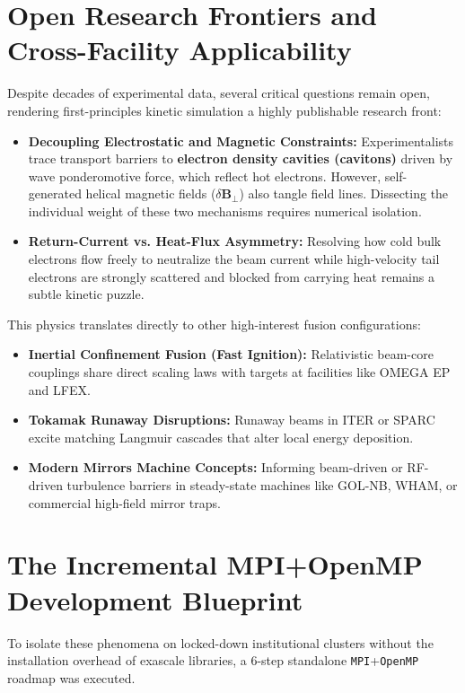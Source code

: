 \documentclass[11pt,a4paper]{article}
\begin{document}
\section{Open Research Frontiers and Cross-Facility Applicability}\label{sec:open_q}
Despite decades of experimental data, several critical questions remain open, rendering first-principles kinetic simulation a highly publishable research front:
\begin{itemize}
    \item \textbf{Decoupling Electrostatic and Magnetic Constraints:} Experimentalists trace transport barriers to \textbf{electron density cavities (cavitons)} driven by wave ponderomotive force, which reflect hot electrons. However, self-generated helical magnetic fields (\(\delta \mathbf{B}_\perp\)) also tangle field lines. Dissecting the individual weight of these two mechanisms requires numerical isolation.
    \item \textbf{Return-Current vs. Heat-Flux Asymmetry:} Resolving how cold bulk electrons flow freely to neutralize the beam current while high-velocity tail electrons are strongly scattered and blocked from carrying heat remains a subtle kinetic puzzle.
\end{itemize}
This physics translates directly to other high-interest fusion configurations:
\begin{itemize}
    \item \textbf{Inertial Confinement Fusion (Fast Ignition):} Relativistic beam-core couplings share direct scaling laws with targets at facilities like OMEGA EP and LFEX.
    \item \textbf{Tokamak Runaway Disruptions:} Runaway beams in ITER or SPARC excite matching Langmuir cascades that alter local energy deposition.
    \item \textbf{Modern Mirrors Machine Concepts:} Informing beam-driven or RF-driven turbulence barriers in steady-state machines like GOL-NB, WHAM, or commercial high-field mirror traps.
\end{itemize}

\section{The Incremental MPI+OpenMP Development Blueprint}\label{sec:roadmap}
To isolate these phenomena on locked-down institutional clusters without the installation overhead of exascale libraries, a 6-step standalone \texttt{MPI}+\texttt{OpenMP} roadmap was executed.
\end{document}
